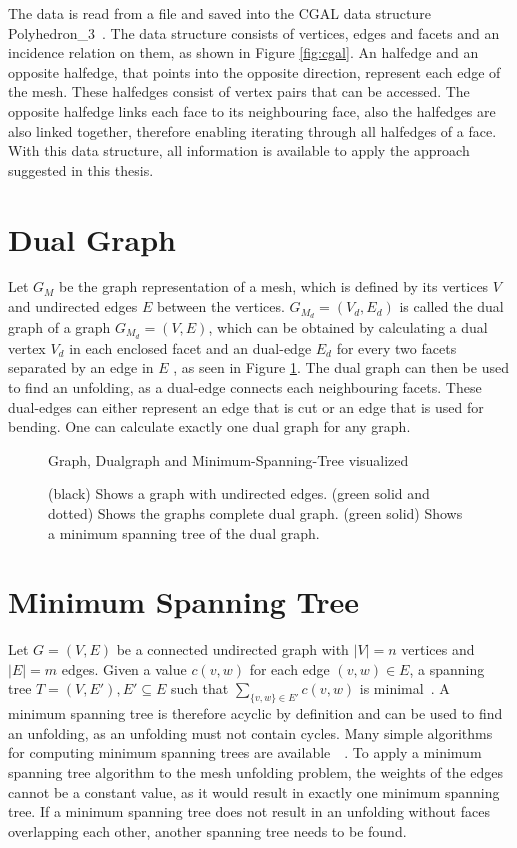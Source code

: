 \documentclass[draft,final]{vutinfth} %
\begin{document}
The data is read from a file and saved into the CGAL data structure Polyhedron\_3~\cite{cgal:eb-19a}. The data structure consists of vertices, edges and facets and an incidence relation on them, as shown in Figure \ref{fig:cgal}. An halfedge and an opposite halfedge, that points into the opposite direction, represent each edge of the mesh. These halfedges consist of vertex pairs that can be accessed. The opposite halfedge links each face to its neighbouring face, also the halfedges are also linked together, therefore enabling iterating through all halfedges of a face. With this data structure, all information is available to apply the approach suggested in this thesis.

\section{Dual Graph}

Let $G_M$ be the graph representation of a mesh, which is defined by its vertices $V$ and undirected edges $E$ between the vertices. $G_{M_d} = (V_d, E_d)$ is called the dual graph of a graph $G_{M_d} = (V,E)$, which can be obtained by calculating a dual vertex $V_d$ in each enclosed facet and an dual-edge $E_d$ for every two facets separated by an edge in $E$ \cite{gross2004handbook}, as seen in Figure \ref{fig:dualgraph}. The dual graph can then be used to find an unfolding, as a dual-edge connects each neighbouring facets. These dual-edges can either represent an edge that is cut or an edge that is used for bending. One can calculate exactly one dual graph for any graph.

\begin{figure}

\caption{(black) Shows a graph with undirected edges. (green solid and dotted) Shows the graphs complete dual graph. (green solid) Shows a minimum spanning tree of the dual graph.}{Graph, Dualgraph and Minimum-Spanning-Tree visualized}
\label{fig:dualgraph}
\end{figure}

\section{Minimum Spanning Tree}

Let $G = (V,E)$ be a connected undirected graph with $|V| = n$ vertices and $|E| = m$ edges. Given a value $c(v,w)$ for each edge $(v,w) \in E$, a spanning tree $T = (V,E'), E' \subseteq E$ such that $\sum_{\{v,w\}\in E'} c(v,w)$ is minimal~\cite{cheriton1976finding}. A minimum spanning tree is therefore acyclic by definition and can be used to find an unfolding, as an unfolding must not contain cycles. Many simple algorithms for computing minimum spanning trees are available~\cite{kruskal1956shortest}~\cite{ahuja1990faster}. To apply a minimum spanning tree algorithm to the mesh unfolding problem, the weights of the edges cannot be a constant value, as it would result in exactly one minimum spanning tree. If a minimum spanning tree does not result in an unfolding without faces overlapping each other, another spanning tree needs to be found.
\end{document}
